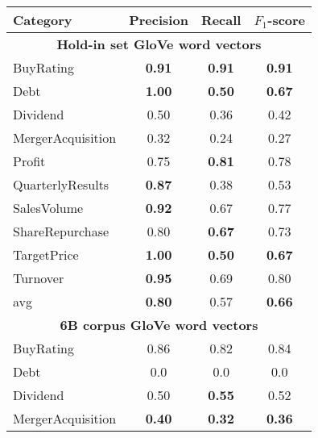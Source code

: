 \documentclass[11pt,a4paper]{article}
\begin{document}
\begin{table}[ht!]
	\centering
	\small{
		\begin{tabular}{p{2.8cm} c c c} 
			\hline
			\textbf{Category}    & \textbf{Precision} & \textbf{Recall} & \textbf{$F_1$-score} \\
			\hline \hline
			\multicolumn{4}{c}{\textbf{Hold-in set GloVe word vectors} } \\
			\hline
			BuyRating            & \textbf{0.91}      & \textbf{0.91}   & \textbf{0.91}        \\
			Debt                 & \textbf{1.00}      & \textbf{0.50}   & \textbf{0.67}        \\
			Dividend             & 0.50               & 0.36            & 0.42                 \\
			MergerAcquisition    & 0.32               & 0.24            & 0.27                 \\
			Profit               & 0.75               & \textbf{0.81}   & 0.78                 \\
			QuarterlyResults     & \textbf{0.87}      & 0.38            & 0.53                 \\
			SalesVolume          & \textbf{0.92}      & 0.67            & 0.77                 \\
			ShareRepurchase      & 0.80               & \textbf{0.67}   & 0.73                 \\
			TargetPrice          & \textbf{1.00}      & \textbf{0.50}   & \textbf{0.67}        \\
			Turnover             & \textbf{0.95}      & 0.69            & 0.80                 \\
			\hline
			avg                  & \textbf{0.80}      & 0.57            & \textbf{0.66}        \\
			\hline \hline
			\multicolumn{4}{c}{\textbf{6B corpus GloVe word vectors} } \\
			\hline
			BuyRating            & 0.86               & 0.82            & 0.84                 \\
			Debt                 & 0.0                & 0.0             & 0.0                  \\
			Dividend             & 0.50               & \textbf{0.55}   & 0.52                 \\
			MergerAcquisition    & \textbf{0.40}      & \textbf{0.32 }  & \textbf{0.36}        \\

\end{tabular}}
\end{table}
\end{document}
